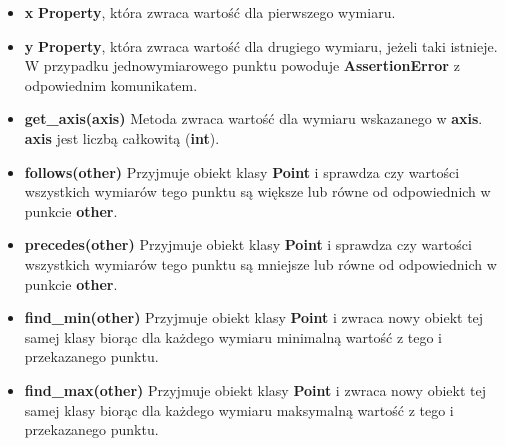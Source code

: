 \documentclass[a4paper, 12pt]{article}
\begin{document}
\begin{itemize}
          \item \textbf{x} \vspace{6pt}\newline
          \quad \textbf{Property}, która zwraca wartość dla pierwszego wymiaru.
          \vspace{6pt}
          
          \item \textbf{y} \vspace{6pt}\newline
          \quad \textbf{Property}, która zwraca wartość dla drugiego wymiaru, jeżeli taki istnieje. W przypadku jednowymiarowego punktu powoduje \textbf{AssertionError} z odpowiednim komunikatem.
          \vspace{6pt}
          
          \item \textbf{get\_axis(axis)} \vspace{6pt}\newline
          \quad Metoda zwraca wartość dla wymiaru wskazanego w \textbf{axis}. \textbf{axis} jest liczbą całkowitą (\textbf{int}).
          \vspace{6pt}
          
          \item \textbf{follows(other)} \vspace{6pt}\newline
          \quad Przyjmuje obiekt klasy \textbf{Point} i sprawdza czy wartości wszystkich wymiarów tego punktu są większe lub równe od odpowiednich w punkcie \textbf{other}.
          \vspace{6pt}
          
          \item \textbf{precedes(other)} \vspace{6pt}\newline
          \quad Przyjmuje obiekt klasy \textbf{Point} i sprawdza czy wartości wszystkich wymiarów tego punktu są mniejsze lub równe od odpowiednich w punkcie \textbf{other}.
          \vspace{6pt}
          
          \item \textbf{find\_min(other)} \vspace{6pt}\newline
          \quad Przyjmuje obiekt klasy \textbf{Point} i zwraca nowy obiekt tej samej klasy biorąc dla każdego wymiaru minimalną wartość z tego i przekazanego punktu.
          \vspace{6pt}
          
          \item \textbf{find\_max(other)} \vspace{6pt}\newline
          \quad Przyjmuje obiekt klasy \textbf{Point} i zwraca nowy obiekt tej samej klasy biorąc dla każdego wymiaru maksymalną wartość z tego i przekazanego punktu.
      \end{itemize}
\end{document}

